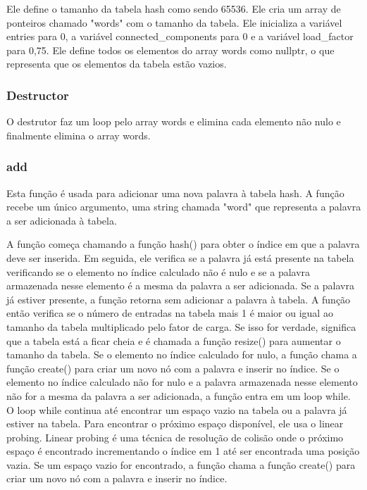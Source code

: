 \documentclass[a4paper,11pt]{article}
\begin{document}
    Ele define o tamanho da tabela hash como sendo 65536.
    Ele cria um array de ponteiros chamado "words" com o tamanho da tabela.
    Ele inicializa a variável entries para 0, a variável connected\_components para 0 e a variável load\_factor para 0,75.
    Ele define todos os elementos do array words como nullptr, o que representa que os elementos da tabela estão vazios.

    \subsubsection{Destructor}
O destrutor faz um loop pelo array words e elimina cada elemento não nulo e finalmente elimina o array words.
   
    \subsubsection{add}
    Esta função é usada para adicionar uma nova palavra à tabela hash. A função recebe um único argumento, uma string chamada "word" que representa a palavra a ser adicionada à tabela.

    A função começa chamando a função hash() para obter o índice em que a palavra deve ser inserida.
    Em seguida, ele verifica se a palavra já está presente na tabela verificando se o elemento no índice calculado não é nulo e se a palavra armazenada nesse elemento é a mesma da palavra a ser adicionada. Se a palavra já estiver presente, a função retorna sem adicionar a palavra à tabela.
    A função então verifica se o número de entradas na tabela mais 1 é maior ou igual ao tamanho da tabela multiplicado pelo fator de carga. Se isso for verdade, significa que a tabela está a ficar cheia e é chamada a função resize() para aumentar o tamanho da tabela.
    Se o elemento no índice calculado for nulo, a função chama a função create() para criar um novo nó com a palavra e inserir no índice.
    Se o elemento no índice calculado não for nulo e a palavra armazenada nesse elemento não for a mesma da palavra a ser adicionada, a função entra em um loop while. O loop while continua até encontrar um espaço vazio na tabela ou a palavra já estiver na tabela. Para encontrar o próximo espaço disponível, ele usa o linear probing. Linear probing é uma técnica de resolução de colisão onde o próximo espaço é encontrado incrementando o índice em 1 até ser encontrada uma posição vazia.
    Se um espaço vazio for encontrado, a função chama a função create() para criar um novo nó com a palavra e inserir no índice.
\end{document}
